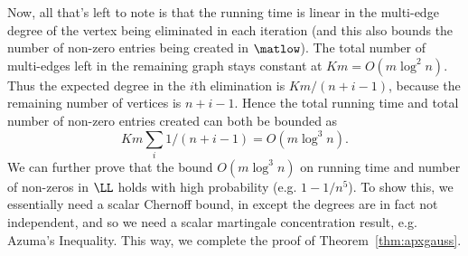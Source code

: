 Now, all that's left to note is that the running time is linear in the
multi-edge degree of the vertex being eliminated in each iteration (and
this also bounds the number of non-zero entries being created in
$\matlow$).
The total number of multi-edges left in the remaining graph stays
constant at $K m = O(m\log^2 n)$.
Thus the expected degree in the $i$th elimination is $K m/(n+i-1)$,
because the remaining number of vertices is $n+i-1$.
Hence the total running time and total number of non-zero entries
created can both be bounded as
\[
  Km\sum_i 1/(n+i-1) = O(m\log^3 n)
  .
  \]
We can further prove that the bound $O(m\log^3 n)$ on running time and
number of non-zeros in $\LL$ holds with high probability
(e.g. $1-1/n^5$).
To show this, we essentially need a scalar Chernoff bound, in except
the degrees are in fact not independent, and so we need a scalar
martingale concentration result, e.g. Azuma's Inequality.
This way, we complete the proof of Theorem~\ref{thm:apxgauss}.
\FloatBarrier

%
%


